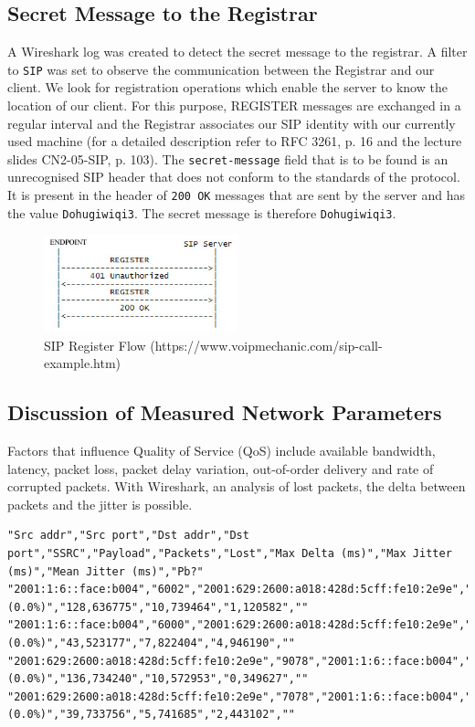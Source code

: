 \documentclass[parskip=full]{scrartcl}
\begin{document}
\subsection{Secret Message to the Registrar}
A Wireshark log was created to detect the secret message to the registrar.
A filter to \texttt{SIP} was set to observe the communication between the Registrar and our client.
We look for registration operations which enable the server to know the location of our client.
For this purpose, REGISTER messages are exchanged in a regular interval and the Registrar associates our SIP identity with our currently used machine (for a detailed description refer to RFC 3261, p. 16 and the lecture slides CN2-05-SIP, p. 103).
The \texttt{secret-message} field that is to be found is an unrecognised SIP header that does not conform to the standards of the protocol.
It is present in the header of \texttt{200 OK} messages that are sent by the server and has the value \texttt{Dohugiwiqi3}.
The secret message is therefore \texttt{Dohugiwiqi3}.
\begin{figure}[ht]
    \centering
   \includegraphics[width=0.5\textwidth]{images/sip_register_flow.jpg} 
    \caption{SIP Register Flow (https://www.voipmechanic.com/sip-call-example.htm)}
    \label{fig:sipRegisterFlow}
\end{figure}
\subsection{Discussion of Measured Network Parameters}
Factors that influence Quality of Service (QoS) include available bandwidth, latency, packet loss, packet delay variation, out-of-order delivery and rate of corrupted packets. 
With Wireshark, an analysis of lost packets, the delta between packets and the jitter is possible.

\begin{verbatim}
"Src addr","Src port","Dst addr","Dst port","SSRC","Payload","Packets","Lost","Max Delta (ms)","Max Jitter (ms)","Mean Jitter (ms)","Pb?"
"2001:1:6::face:b004","6002","2001:629:2600:a018:428d:5cff:fe10:2e9e","9078","0x86A4B38B","VP8","1553","0 (0.0%)","128,636775","10,739464","1,120582",""
"2001:1:6::face:b004","6000","2001:629:2600:a018:428d:5cff:fe10:2e9e","7078","0x4F6D67D8","opus","497","0 (0.0%)","43,523177","7,822404","4,946190",""
"2001:629:2600:a018:428d:5cff:fe10:2e9e","9078","2001:1:6::face:b004","6002","0x86A4B38B","VP8","1553","0 (0.0%)","136,734240","10,572953","0,349627",""
"2001:629:2600:a018:428d:5cff:fe10:2e9e","7078","2001:1:6::face:b004","6000","0x4F6D67D8","opus","497","0 (0.0%)","39,733756","5,741685","2,443102",""
\end{verbatim}
\end{document}
